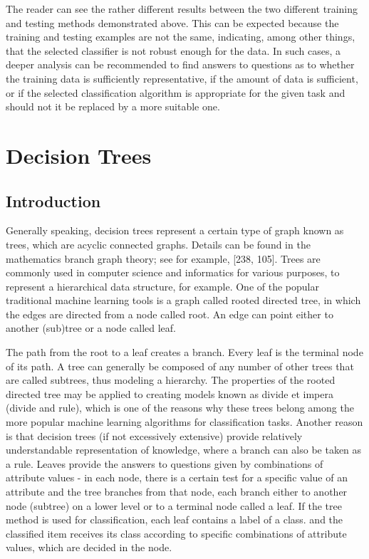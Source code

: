 \documentclass[11pt,openany,executivepaper]{book}
\begin{document}
The reader can see the rather different results between the two different training and testing methods demonstrated above. This can be expected because the
training and testing examples are not the same, indicating, among other things,
that the selected classifier is not robust enough for the data. In such cases, a
deeper analysis can be recommended to find answers to questions as to whether
the training data is sufficiently representative, if the amount of data is sufficient,
or if the selected classification algorithm is appropriate for the given task and
should not it be replaced by a more suitable one.


\chapter{Decision Trees} %

\section{Introduction}

Generally speaking, decision trees represent a certain type of graph known as
trees, which are acyclic connected graphs. Details can be found in the mathematics branch graph theory; see for example, [238, 105]. Trees are commonly
used in computer science and informatics for various purposes, to represent a
hierarchical data structure, for example.
One of the popular traditional machine learning tools is a graph called rooted
directed tree, in which the edges are directed from a node called root. An edge
can point either to another (sub)tree or a node called leaf.

The path from the root to a leaf creates a branch. Every leaf is the terminal
node of its path. A tree can generally be composed of any number of other trees
that are called subtrees, thus modeling a hierarchy.
The properties of the rooted directed tree may be applied to creating models known as divide et impera (divide and rule), which is one of the reasons
why these trees belong among the more popular machine learning algorithms for
classification tasks. Another reason is that decision trees (if not excessively extensive) provide relatively understandable representation of knowledge, where a
branch can also be taken as a rule. Leaves provide the answers to questions given
by combinations of attribute values - in each node, there is a certain test for a
specific value of an attribute and the tree branches from that node, each branch
either to another node (subtree) on a lower level or to a terminal node called a
leaf. If the tree method is used for classification, each leaf contains a label of a
class. and the classified item receives its class according to specific combinations
of attribute values, which are decided in the node.
\end{document}
